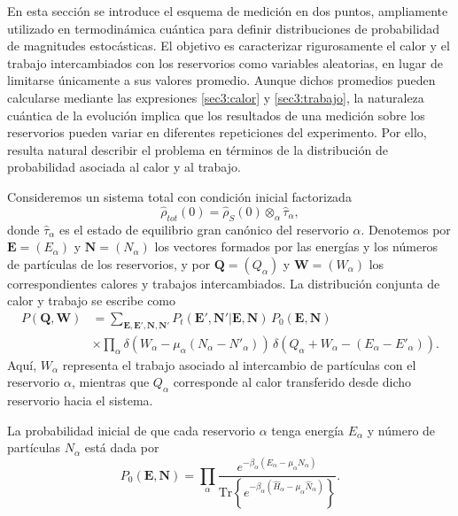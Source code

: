En esta sección se introduce el esquema de medición en dos puntos, ampliamente utilizado en termodinámica cuántica para definir distribuciones de probabilidad de magnitudes estocásticas\cite{esposito2009nonequilibrium}. El objetivo es caracterizar rigurosamente el calor y el trabajo intercambiados con los reservorios como variables aleatorias, en lugar de limitarse únicamente a sus valores promedio. Aunque dichos promedios pueden calcularse mediante las expresiones \ref{sec3:calor} y \ref{sec3:trabajo}, la naturaleza cuántica de la evolución implica que los resultados de una medición sobre los reservorios pueden variar en diferentes repeticiones del experimento. Por ello, resulta natural describir el problema en términos de la distribución de probabilidad asociada al calor y al trabajo.

Consideremos un sistema total con condición inicial factorizada
\[
\hat{\rho}_{tot}(0) = \hat{\rho}_{S}(0)\otimes_{\alpha}\hat{\tau}_{\alpha},
\]
donde $\hat{\tau}_{\alpha}$ es el estado de equilibrio gran canónico del reservorio $\alpha$. Denotemos por $\mathbf{E}=(E_{\alpha})$ y $\mathbf{N}=(N_{\alpha})$ los vectores formados por las energías y los números de partículas de los reservorios, y por $\mathbf{Q}=(Q_{\alpha})$ y $\mathbf{W}=(W_{\alpha})$ los correspondientes calores y trabajos intercambiados. La distribución conjunta de calor y trabajo se escribe como
\begin{align*}
    P(\mathbf{Q},\mathbf{W}) & = \sum_{\mathbf{E},\mathbf{E}',\mathbf{N},\mathbf{N}'} 
    P_{t}(\mathbf{E}',\mathbf{N}'|\mathbf{E},\mathbf{N})\, P_{0}(\mathbf{E},\mathbf{N}) \\
    & \times \prod_{\alpha} \delta\!\left(W_{\alpha}-\mu_{\alpha}(N_{\alpha}-N'_{\alpha})\right)\,
    \delta\!\left(Q_{\alpha}+W_{\alpha}-(E_{\alpha}-E'_{\alpha})\right).
\end{align*}
Aquí, $W_\alpha$ representa el trabajo asociado al intercambio de partículas con el reservorio $\alpha$, mientras que $Q_\alpha$ corresponde al calor transferido desde dicho reservorio hacia el sistema.

La probabilidad inicial de que cada reservorio $\alpha$ tenga energía $E_{\alpha}$ y número de partículas $N_{\alpha}$ está dada por
\[
P_{0}(\mathbf{E},\mathbf{N}) = 
\prod_{\alpha}  
\frac{e^{-\beta_{\alpha}(E_{\alpha}-\mu_{\alpha}N_{\alpha})}}
{\text{Tr}\left\{e^{-\beta_{\alpha}(\hat{H}_{\alpha}-\mu_{\alpha}\hat{N}_{\alpha})}\right\}}.
\]

